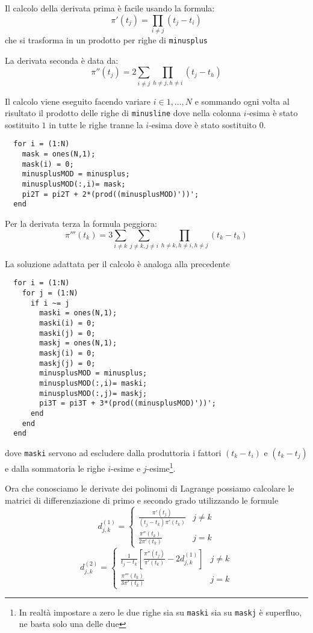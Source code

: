 \documentclass[a4paper,10pt]{article}
\theoremstyle{plain}
\theoremstyle{definition}
\theoremstyle{remark}
\newcommand{\pa}[1]{\left(#1\right)}
\newcommand{\bra}[1]{\left[#1\right]}
\begin{document}
Il calcolo della derivata prima è facile usando la formula:
\[ \pi ' (t_j) = \prod _{i\neq j} \pa{t_j - t_i} \]
che si trasforma in un prodotto per righe di \lstinline{minusplus}

La derivata seconda è data da:
\[ \pi'' (t_j) = 2 \sum _{i\neq j} \prod _{
    h\neq j, h\neq i
  } (t_j - t_h)
\]

Il calcolo viene eseguito facendo variare $i\in 1,...,N$ e sommando
ogni volta al risultato il prodotto delle righe di
\lstinline{minusline} dove nella colonna $i$-esima è stato sostituito
$1$ in tutte le righe tranne la $i$-esima dove è stato sostituito $0$.
\begin{lstlisting}
  for i = (1:N)
    mask = ones(N,1);
    mask(i) = 0;
    minusplusMOD = minusplus;
    minusplusMOD(:,i)= mask;
    pi2T = pi2T + 2*(prod((minusplusMOD)'))';
  end
\end{lstlisting}

Per la derivata terza la formula peggiora:
\[ \pi ''' (t_k) = 3 \sum _{i\neq k} \sum _{j\neq k, j\neq i} \prod
_{h\neq k, h\neq i, h\neq j} (t_k - t_h) \]

La soluzione adattata per il calcolo è analoga alla precedente
\begin{lstlisting}
  for i = (1:N)
    for j = (1:N)
      if i ~= j
        maski = ones(N,1);
        maski(i) = 0;
        maski(j) = 0;
        maskj = ones(N,1);
        maskj(i) = 0;
        maskj(j) = 0;
        minusplusMOD = minusplus;
        minusplusMOD(:,i)= maski;
        minusplusMOD(:,j)= maskj;
        pi3T = pi3T + 3*(prod((minusplusMOD)'))';
      end
    end
  end
\end{lstlisting}
dove \lstinline{maski} servono ad escludere dalla produttoria i
fattori $(t_k - t_i)$ e $(t_k - t_j)$ e dalla sommatoria le righe
$i$-esime e $j$-esime\footnote{In realtà impostare a zero le due righe
  sia su \lstinline{maski} sia su \lstinline{maskj} è superfluo, ne
  basta solo una delle due}.

Ora che conosciamo le derivate dei polinomi di Lagrange possiamo
calcolare le matrici di differenziazione di primo e secondo grado
utilizzando le formule
\[ d^{(1)} _{j,k} = \left\{
  \begin{matrix}
    \frac{\pi'(t_j)}{(t_j - t_k)\pi'(t_k)} & j\neq k \\
    \frac{\pi''(t_k)}{2\pi'(t_k)} & j = k
  \end{matrix}
\right.
\]
\[ d^{(2)} _{j,k} = \left\{
  \begin{matrix}
    \frac{1}{t_j-t_k}\bra{\frac{\pi''(t_j)}{\pi'(t_k)} - 2 d^{(1)}
      _{j,k} } & j\neq k \\
    \frac{\pi'''(t_k)}{3\pi'(t_k)} & j = k
  \end{matrix}
\right.
\]
\end{document}

